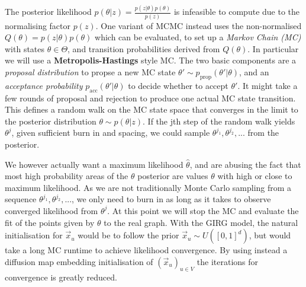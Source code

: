 The posterior likelihood $p(\theta | z) = \frac{p(z | \theta) p(\theta)}{p(z)}$ is infeasible to compute due to the normalising factor $p(z)$. One variant of MCMC instead uses the non-normalised $Q(\theta) = p(z | \theta) p(\theta)$ which can be evaluated, to set up a \textit{Markov Chain (MC)} with states $\theta \in \Theta$, and transition probabilities derived from $Q(\theta)$.
In particular we will use a \textbf{Metropolis-Hastings} style MC. The two basic components are a \textit{proposal distribution} to propse a new MC state $\theta' \sim p_{\mathrm{prop}}(\theta' | \theta)$, and an \textit{acceptance probability} $p_{\mathrm{acc}}(\theta' | \theta)$ to decide whether to accept $\theta'$. It might take a few rounds of proposal and rejection to produce one actual MC state transition. This defines  a random walk on the MC state space that converges in the limit to the posterior distribution $\theta \sim p(\theta | z)$. If the jth step of the random walk yields $\theta^j$, given sufficient burn in and spacing, we could sample $\theta^{j_1}, \theta^{j_2}, ...$ from the posterior.

We however actually want a maximum likelihood $\hat{\theta}$, and are abusing the fact that most high probability areas of the $\theta$ posterior are values $\theta$ with high or close to maximum likelihood. As we are not traditionally Monte Carlo sampling from a sequence $\theta^{j_1}, \theta^{j_2}, ...$, we only need to burn in as long as it takes to observe converged likelihood from $\theta^j$. At this point we will stop the MC and evaluate the fit of the points given by $\theta$ to the real graph. With the GIRG model, the natural initialisation for $\vec{x}_u$ would be to follow the prior $\vec{x}_u \sim U([0, 1]^d)$, but would take a long MC runtime to achieve likelihood convergence. By using instead a diffusion map embedding initialisation of $(\vec{x}_u)_{u \in V}$ the iterations for convergence is greatly reduced.

